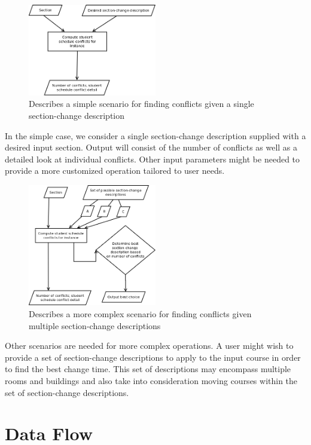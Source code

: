 \documentclass[11pt]{article}
\begin{document}
\begin{figure}[h]
  \centering
  \includegraphics[width=0.5\textwidth]{diagrams/scenarioA.png}
  \caption{Describes a simple scenario for finding conflicts given a single section-change description}
\end{figure}

In the simple case, we consider a single section-change description supplied with a desired input section. Output will consist of the
number of conflicts as well as a detailed look at individual conflicts. Other input parameters might be needed to provide a more 
customized operation tailored to user needs.

\begin{figure}[h]
  \centering
  \includegraphics[width=0.5\textwidth]{diagrams/scenarioB.png}
  \caption{Describes a more complex scenario for finding conflicts given multiple section-change descriptions}
\end{figure}

Other scenarios are needed for more complex operations. A user might wish to provide a set of section-change descriptions to apply to
the input course in order to find the best change time. This set of descriptions may encompass multiple rooms and buildings and also
take into consideration moving courses within the set of section-change descriptions.

\pagebreak[4]

\section{Data Flow} \label{sec:dataflow}
\end{document}
